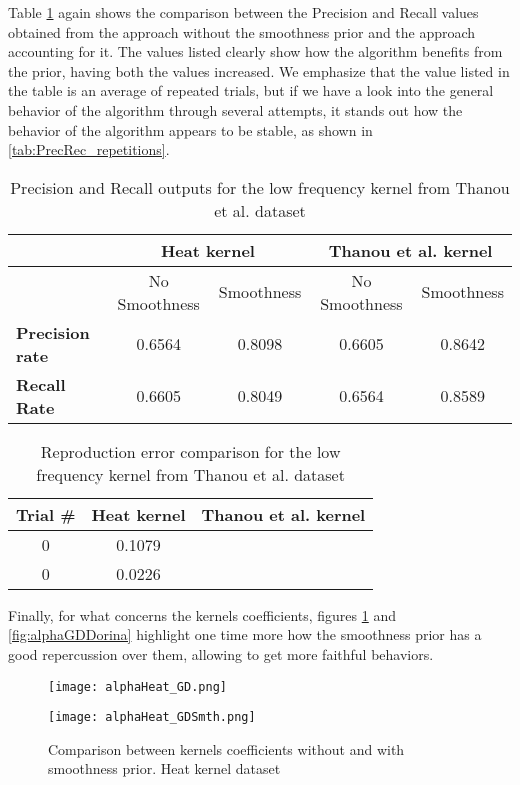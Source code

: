 Table \ref{tab:PrecRec_compSmth} again shows the comparison between the Precision and Recall values obtained from the approach without the smoothness prior and the approach accounting for it. The values listed clearly show how the algorithm benefits from the prior, having both the values increased. We emphasize that the value listed in the table is an average of repeated trials, but if we have a look into the general behavior of the algorithm through several attempts, it stands out how the behavior of the algorithm appears to be stable, as shown in \autoref{tab:PrecRec_repetitions}.

\begin{table}[htbp]
  \centering
  \begin{tabular}{lcccc}
  &\multicolumn{2}{c}{\textbf{Heat kernel}}&\multicolumn{2}{c}{\textbf{Thanou et al. kernel}}\\
  \toprule
  &No Smoothness & Smoothness & No Smoothness & Smoothness\\ %
    \midrule
    \textbf{Precision rate} & 0.6564 & 0.8098 & 0.6605 & 0.8642\\
    \textbf{Recall Rate} & 0.6605 & 0.8049 & 0.6564 & 0.8589\\
    \bottomrule
  \end{tabular}
  \caption{Precision and Recall outputs for the low frequency kernel from Thanou et al. dataset}
  \label{tab:PrecRec_compSmth}
\end{table}

\begin{table}[htbp]
  \centering
  \begin{tabular}{ccc}
  \textbf{Trial \#} & \textbf{Heat kernel} & \textbf{Thanou et al. kernel}\\
  \midrule
    0 & 0.1079\\
    0 & 0.0226\\
    \bottomrule
  \end{tabular}
  \caption{Reproduction error comparison for the low frequency kernel from Thanou et al. dataset}
  \label{tab:PrecRec_repetitions}
\end{table}

Finally, for what concerns the kernels coefficients, figures \ref{fig:alphaGDHeat} and \ref{fig:alphaGDDorina} highlight one time more how the smoothness prior has a good repercussion over them, allowing to get more faithful behaviors.

\begin{figure}
  \centering
  \begin{minipage}[c]{.8\textwidth}
    \centering
    \texttt{[image: alphaHeat\_GD.png]}
  \end{minipage}
  \begin{minipage}[c]{.8\textwidth}
    \centering
    \texttt{[image: alphaHeat\_GDSmth.png]}
  \end{minipage}
  \caption{Comparison between kernels coefficients without and with smoothness prior. Heat kernel   dataset}
  \label{fig:alphaGDHeat}
\end{figure}

